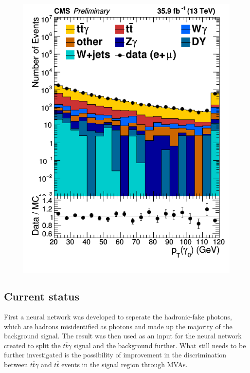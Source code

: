 \documentclass[11pt]{scrartcl}
\begin{document}
\begin{figure}[H]
\begin{minipage}{.5\textwidth}
  \includegraphics[width=1\linewidth]{figures/PhotonGood0_pt_log.png}
  \label{fig:PhotonPTlog}
\end{minipage}
\end{figure}

	\subsection{Current status}
	
	First a neural network was developed to seperate the hadronic-fake photons, which are hadrons misidentified as photons and made up the majority of the background signal. The result was then used as an input for the neural network created to split the $t\overline{t}\gamma$ signal and the background further. What still needs to be further investigated is the possibility of improvement in the discrimination between $t\overline{t}\gamma$ and $t\overline{t}$ events in the signal region through MVAs.
\end{document}
